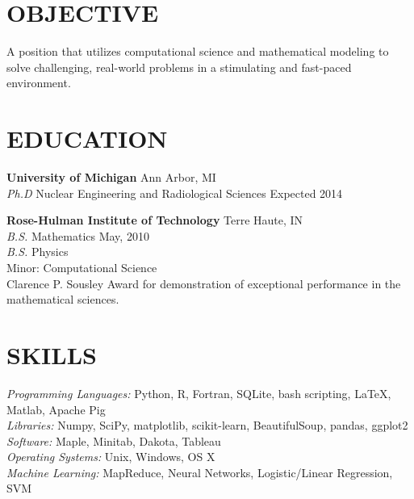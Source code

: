 \documentclass[margin, 10pt]{res} %
\begin{document}
\begin{resume}

 
\section{OBJECTIVE}  

A position that utilizes computational science and mathematical modeling to solve challenging, real-world problems in a stimulating and fast-paced environment.    


\section{EDUCATION}

\textbf{University of Michigan} \hfill Ann Arbor, MI \\
{\sl Ph.D} Nuclear Engineering and Radiological Sciences \hfill Expected 2014

\textbf{Rose-Hulman Institute of Technology} \hfill Terre Haute, IN \\
{\sl B.S.} Mathematics \hfill May, 2010 \\
{\sl B.S.} Physics \\
Minor: Computational Science \\
Clarence P. Sousley Award for demonstration of exceptional performance in the mathematical sciences.
 

\section{SKILLS} 

{\sl Programming Languages:} Python, R, Fortran, SQLite, bash scripting, \LaTeX, Matlab, Apache Pig \\
{\sl Libraries:} Numpy, SciPy, matplotlib, scikit-learn, BeautifulSoup, pandas, ggplot2 \\
{\sl Software:} Maple, Minitab, Dakota, Tableau \\
{\sl Operating Systems:} Unix, Windows, OS X \\
{\sl Machine Learning:} MapReduce, Neural Networks, Logistic/Linear Regression, SVM
 

\end{resume}
\end{document}
